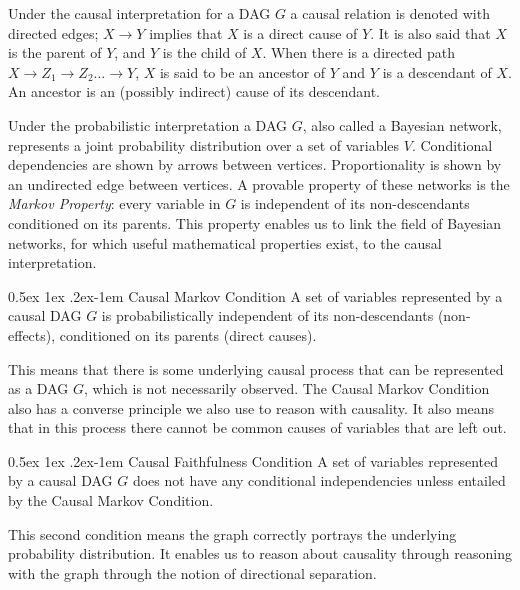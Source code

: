 \documentclass[a4paper, 10pt, english, onecolumn]{article}
\makeatletter
\renewcommand{\paragraph}{%
  \@startsection{paragraph}{4}%
  {\z@}{0.5ex \@plus 1ex \@minus .2ex}{-1em}%
  {\normalfont\normalsize\bfseries}%
}
\makeatother
\begin{document}
Under the causal interpretation for a DAG $G$ a causal relation is denoted with directed edges; $X \rightarrow Y$ implies that $X$ is a direct cause of $Y$.
It is also said that $X$ is the parent of $Y$, and $Y$ is the child of $X$. 
When there is a directed path $X \rightarrow Z_1 \rightarrow Z_2 \dots \rightarrow Y$, $X$ is said to be an ancestor of $Y$ and $Y$ is a descendant of $X$.
An ancestor is an (possibly indirect) cause of its descendant.

Under the probabilistic interpretation a DAG $G$, also called a Bayesian network, represents a joint probability distribution over a set of variables $V$.
Conditional dependencies are shown by arrows between vertices.
Proportionality is shown by an undirected edge between vertices.
A provable property of these networks is the \textit{Markov Property}: every variable in $G$ is independent of its non-descendants conditioned on its parents.
This property enables us to link the field of Bayesian networks, for which useful mathematical properties exist, to the causal interpretation.

\paragraph{Causal Markov Condition}
A set of variables represented by a causal DAG $G$ is probabilistically independent of its non-descendants (non-effects), conditioned on its parents (direct causes).

This means that there is some underlying causal process that can be represented as a DAG $G$, which is not necessarily observed.
The Causal Markov Condition also has a converse principle we also use to reason with causality.
It also means that in this process there cannot be common causes of variables that are left out.

\paragraph{Causal Faithfulness Condition}
A set of variables represented by a causal DAG $G$ does not have any conditional independencies unless entailed by the Causal Markov Condition.

This second condition means the graph correctly portrays the underlying probability distribution.
It enables us to reason about causality through reasoning with the graph through the notion of directional separation.
\end{document}
